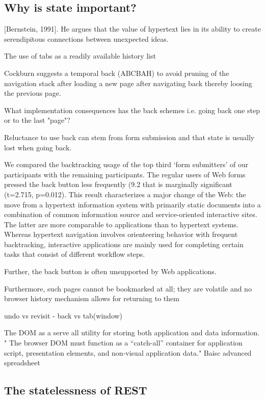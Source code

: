 \documentclass[english]{ifimaster}
\begin{document}
\subsection{Why is state important?}
 [Bernstein, 1991]. He argues that
the value of hypertext lies in its ability to create
serendipitous connections between unexpected
ideas.

The use of tabs as a readily available history list

Cockburn suggests a temporal back (ABCBAH) to avoid pruning of the navigation stack after loading a new page after navigating back thereby loosing the previous page.

What implementation consequences has the back schemes i.e. going back one step or to the last "page"?

Reluctance to use back can stem from form submission and that state is usually lost when going back.\parencite{obendorf}

We compared
the backtracking usage of the top third ‘form submitters’ of
our participants with the remaining participants. The regular
users of Web forms pressed the back button less frequently
(9.2%
that is marginally significant (t=2.715, p=0.012). This
result characterizes a major change of the Web: the move
from a hypertext information system with primarily static
documents into a combination of common information
source and service-oriented interactive sites. The latter are
more comparable to applications than to hypertext systems.
Whereas hypertext navigation involves orienteering behavior
with frequent backtracking, interactive applications are
mainly used for completing certain tasks that consist of
different workflow steps.\parencite{obendorf}

Further, the back button is often unsupported by Web applications.

 Furthermore, such pages cannot
be bookmarked at all; they are volatile and no browser
history mechanism allows for returning to them
\parencite{obendorf}

undo vs revisit - back vs tab(window)

The DOM as a serve all utility for storing both application and data information.
" The browser DOM must function as a
“catch-all” container for application script, presentation
elements, and non-visual application data."\parencite{castro}
Baisc advanced spreadsheet\parencite{jafry}
\subsection{The statelessness of REST}
\end{document}
